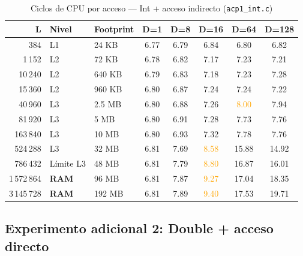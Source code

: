 \documentclass[12pt,a4paper]{article}
\newcommand{\verde}[1]{\textcolor{verde}{#1}}
\newcommand{\amarillo}[1]{\textcolor{orange}{#1}}
\newcommand{\rojo}[1]{\textcolor{rojo}{#1}}
\begin{document}
\begin{table}[H]
\centering
\caption{Ciclos de CPU por acceso — Int + acceso indirecto (\texttt{acp1\_int.c})}
\label{tab:int_ind}
\setlength{\tabcolsep}{5pt}
\begin{tabular}{rllccccc}
\toprule
\textbf{L} & \textbf{Nivel} & \textbf{Footprint} & \textbf{D=1} & \textbf{D=8} & \textbf{D=16} & \textbf{D=64} & \textbf{D=128} \\
\midrule
384        & L1         & 24 KB   & \verde{6.77} & \verde{6.79} & \verde{6.84} & \verde{6.80} & \verde{6.82} \\
1\,152     & L2         & 72 KB   & \verde{6.78} & \verde{6.82} & \verde{7.17} & \verde{7.23} & \verde{7.21} \\
10\,240    & L2         & 640 KB  & \verde{6.79} & \verde{6.83} & \verde{7.18} & \verde{7.23} & \verde{7.28} \\
15\,360    & L2         & 960 KB  & \verde{6.80} & \verde{6.87} & \verde{7.24} & \verde{7.24} & \verde{7.22} \\
40\,960    & L3         & 2.5 MB  & \verde{6.80} & \verde{6.88} & \verde{7.26} & \amarillo{8.00} & \verde{7.94} \\
81\,920    & L3         & 5 MB    & \verde{6.80} & \verde{6.91} & \verde{7.28} & \verde{7.73} & \verde{7.76} \\
163\,840   & L3         & 10 MB   & \verde{6.80} & \verde{6.93} & \verde{7.32} & \verde{7.78} & \verde{7.76} \\
524\,288   & L3         & 32 MB   & \verde{6.81} & \verde{7.69} & \amarillo{8.58} & \rojo{15.88} & \rojo{14.92} \\
786\,432   & Límite L3  & 48 MB   & \verde{6.81} & \verde{7.79} & \amarillo{8.80} & \rojo{16.87} & \rojo{16.01} \\
1\,572\,864 & \textbf{RAM} & 96 MB & \verde{6.81} & \verde{7.87} & \amarillo{9.27} & \rojo{17.04} & \rojo{18.35} \\
3\,145\,728 & \textbf{RAM} & 192 MB & \verde{6.81} & \verde{7.89} & \amarillo{9.40} & \rojo{17.53} & \rojo{19.71} \\
\bottomrule
\end{tabular}
\end{table}

\subsection{Experimento adicional 2: Double + acceso directo}
\end{document}
